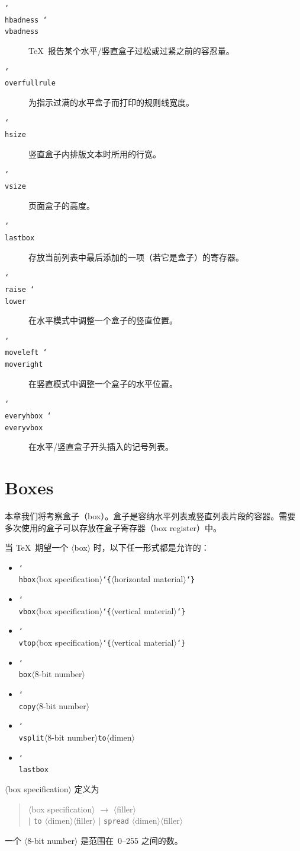 \documentclass[a4paper]{rapport3}
\def\nl{\protect\\}\def\n#1{{\tt #1}}\def\cs#1{{\tt\char`\\#1}}\let\csc\cs
\def\lb{{\tt\char`\{}}\def\rb{{\tt\char`\}}}
\def\gr#1{$\langle$#1$\rangle$}\def\key#1{{\tt#1}}
\newenvironment{disp}{\begin{quotation}}{\end{quotation}}
\newenvironment{inventory}{\begin{description}}{\end{description}}
\begin{document}
\begin{inventory}
\item [\cs{hbadness \cs{vbadness}}]
      \TeX\ 报告某个水平/竖直盒子过松或过紧之前的容忍量。

\item [\cs{overfullrule}]
      为指示过满的水平盒子而打印的规则线宽度。


\item [\cs{hsize}]
      竖直盒子内排版文本时所用的行宽。
\awp

\item [\cs{vsize}]
      页面盒子的高度。


\item [\cs{lastbox}]
      存放当前列表中最后添加的一项（若它是盒子）的寄存器。

\item [\cs{raise \cs{lower}}]
      在水平模式中调整一个盒子的竖直位置。

\item [\cs{moveleft \cs{moveright}}]
      在竖直模式中调整一个盒子的水平位置。

\item [\cs{everyhbox \cs{everyvbox}}]
\mdqon
      在水平/竖直盒子开头插入的记号列表。
\mdqoff
\mdqoff

\end{inventory}

\section{Boxes}

本章我们将考察盒子（box）。盒子是容纳水平列表或竖直列表片段的容器。需要多次使用的盒子可以存放在盒子寄存器（box register）中。

当 \TeX\ 期望一个 \gr{box} 时，以下任一形式都是允许的：
\begin{itemize}
\item \cs{hbox}\gr{box specification}\lb\gr{horizontal material}\rb
\item \cs{vbox}\gr{box specification}\lb\gr{vertical material}\rb
\item \cs{vtop}\gr{box specification}\lb\gr{vertical material}\rb
\item \cs{box}\gr{8-bit number}
\item \cs{copy}\gr{8-bit number}
\item \cs{vsplit}\gr{8-bit number}\n{to}\gr{dimen}
\item \cs{lastbox}
\end{itemize}
\gr{box specification} 定义为\label{box:spec}
\begin{disp}\gr{box specification} $\longrightarrow$ \gr{filler}
\nl\indent$|$ \n{to} \gr{dimen}\gr{filler} 
          $|$ \n{spread} \gr{dimen}\gr{filler}
\end{disp}
一个 \gr{8-bit number} 是范围在~0--255 之间的数。
\end{document}
